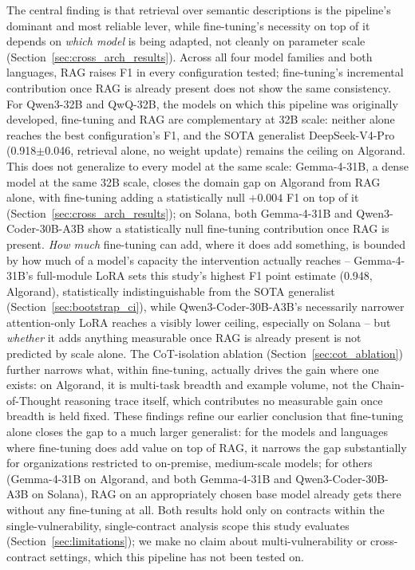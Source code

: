 \documentclass[lettersize,journal]{IEEEtran}
\begin{document}
The central finding is that retrieval over semantic descriptions is the pipeline's dominant and most
reliable lever, while fine-tuning's necessity on top of it depends on \emph{which model} is being
adapted, not cleanly on parameter scale (Section~\ref{sec:cross_arch_results}). Across all four
model families and both languages, RAG raises F1 in every configuration tested; fine-tuning's
incremental contribution once RAG is already present does not show the same consistency. For
Qwen3-32B and QwQ-32B, the models on which this pipeline was originally developed, fine-tuning and
RAG are complementary at 32B scale: neither alone reaches the best configuration's F1, and the SOTA
generalist DeepSeek-V4-Pro (0.918$\pm$0.046, retrieval alone, no weight update) remains the ceiling
on Algorand. This does not generalize to every model at the same scale: Gemma-4-31B, a dense model
at the same 32B scale, closes the domain gap on Algorand from RAG alone, with fine-tuning adding a
statistically null $+0.004$ F1 on top of it (Section~\ref{sec:cross_arch_results}); on Solana, both
Gemma-4-31B and Qwen3-Coder-30B-A3B show a statistically null fine-tuning contribution once RAG is
present. \emph{How much} fine-tuning can add, where it does add something, is bounded by how much of
a model's capacity the intervention actually reaches -- Gemma-4-31B's full-module LoRA sets this
study's highest F1 point estimate (0.948, Algorand), statistically indistinguishable from the SOTA
generalist (Section~\ref{sec:bootstrap_ci}), while Qwen3-Coder-30B-A3B's necessarily narrower
attention-only LoRA reaches a visibly lower ceiling, especially on Solana -- but \emph{whether} it
adds anything measurable once RAG is already present is not predicted by scale alone. The
CoT-isolation ablation (Section~\ref{sec:cot_ablation}) further narrows what, within fine-tuning,
actually drives the gain where one exists: on Algorand, it is multi-task breadth and example volume,
not the Chain-of-Thought reasoning trace itself, which contributes no measurable gain once breadth
is held fixed. These findings refine our earlier conclusion \cite{boi2025} that fine-tuning alone
closes the gap to a much larger generalist: for the models and languages where fine-tuning does add
value on top of RAG, it narrows the gap substantially for organizations restricted to on-premise,
medium-scale models; for others (Gemma-4-31B on Algorand, and both Gemma-4-31B and
Qwen3-Coder-30B-A3B on Solana), RAG on an appropriately chosen base model already gets there without
any fine-tuning at all. Both results hold only on contracts within the single-vulnerability,
single-contract analysis scope this study evaluates (Section~\ref{sec:limitations}); we make no
claim about multi-vulnerability or cross-contract settings, which this pipeline has not been tested
on.
\end{document}
